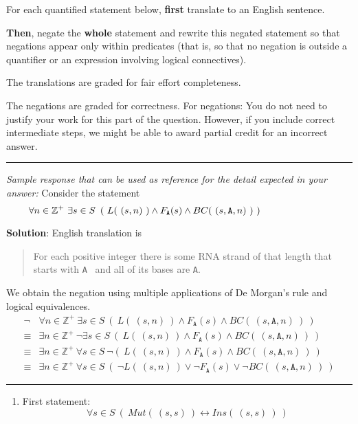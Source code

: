 \documentclass[12pt, oneside]{article}
\newcommand{\A}[0]{\texttt{A}}
\begin{document}
\begin{enumerate}
   For each quantified statement below, {\bf first} translate to an English sentence.

   {\bf Then}, negate the {\bf whole} statement and rewrite this
   negated statement so that negations appear only within predicates 
   (that is, so that no negation is outside a quantifier or an expression involving logical connectives).
 
    The translations are graded for fair effort completeness.
 
   The negations are graded for correctness. For negations: You do not need to justify 
   your work for this part of the question.  However, if you include correct
   intermediate steps, we might be able to award partial credit for an incorrect answer.
 
  \rule{0.5\textwidth}{.4pt}
 
 {\it Sample response that can be used as reference for the detail expected 
 in your answer:} 
 Consider the statement
 \[
  \hspace{-1in}\forall n \in \mathbb{Z}^+~ \exists s \in S~\left( ~L(~(s,n)~) \land F_\A (s) \land BC(~(s,\A,n)~)~\right)
  \]
  
 {\bf Solution}: English translation is 
 \begin{quote}
 For each positive integer there is some RNA strand of that length that starts 
 with \A~ and all of its bases are \A.
 \end{quote} 
 
 We obtain the negation using multiple applications of De Morgan's rule and logical equivalences. 
 \begin{align*}
 \lnot &\forall n \in \mathbb{Z}^+~ \exists s \in S~\left( ~L(~(s,n)~) \land F_\A (s) \land BC(~(s,\A,n)~)~\right) \\
 \equiv&\exists n \in \mathbb{Z}^+~ \lnot \exists s \in S~\left( ~L(~(s,n)~) \land F_\A (s) \land BC(~(s,\A,n)~)~\right) \\
 \equiv&\exists n \in \mathbb{Z}^+~ \forall s \in S~\lnot \left( ~L(~(s,n)~) \land F_\A (s) \land BC(~(s,\A,n)~)~\right) \\
 \equiv&\exists n \in \mathbb{Z}^+~ \forall s \in S~\left( ~\lnot L(~(s,n)~) \lor \lnot F_\A (s) \lor \lnot BC(~(s,\A,n)~)~\right)
 \end{align*}
 
 
 \rule{0.5\textwidth}{.4pt}
 
 
 \begin{enumerate}
 \item  First statement:
 \[
 \forall s \in S ~\left( ~Mut(~(s,s)~) \leftrightarrow Ins(~(s,s)~) ~\right)
 \]
 

\end{enumerate}
\end{enumerate}
\end{document}
